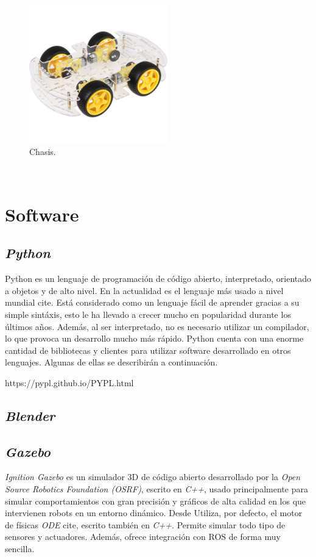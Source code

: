 \begin{figure} [h!]
	\begin{center}
		\includegraphics[width=6cm]{figs/chasis}
	\end{center}
	\caption{Chasis.}
	\label{fig:chasis}
\end{figure}\

\section{Software}

\subsection{\textit{Python}}
Python es un lenguaje de programación de código abierto, interpretado, orientado a objetos y de alto nivel. En la actualidad es el lenguaje más usado a nivel mundial cite. Está considerado como un lenguaje fácil de aprender gracias a su simple sintáxis, esto le ha llevado a crecer mucho en popularidad durante los últimos años. Además, al ser interpretado, no es necesario utilizar un compilador, lo que provoca un desarrollo mucho más rápido. Python cuenta con una enorme cantidad de bibliotecas y clientes para utilizar software desarrollado en otros lenguajes. Algunas de ellas se describirán a continuación. 


https://pypl.github.io/PYPL.html
\subsection{\textit{Blender}}

\subsection{\textit{Gazebo}}
\textit{Ignition Gazebo} es un simulador 3D de código abierto desarrollado por la \textit{Open Source Robotics Foundation (OSRF)}, escrito en \textit{C++}, usado principalmente para simular comportamientos con gran precisión y gráficos de alta calidad en los que intervienen robots en un entorno dinámico. Desde  Utiliza, por defecto, el motor de físicas \textit{ODE} cite, escrito también en \textit{C++}. Permite simular todo tipo de sensores y actuadores. Además, ofrece integración con ROS de forma muy sencilla. 

